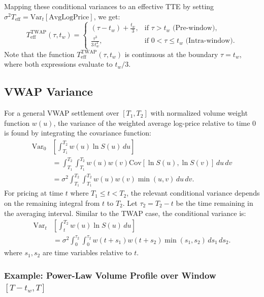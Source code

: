 \documentclass[11pt]{article}
\theoremstyle{plain}
\begin{document}
Mapping these conditional variances to an effective TTE by setting $\sigma^2 T_{\mathrm{eff}} = \mathrm{Var}_t[\text{AvgLogPrice}]$, we get:
\begin{equation} \label{eq:tte_eff_twap}
  T_{\mathrm{eff}}^{\mathrm{TWAP}}(\tau, t_w) =
  \begin{cases}
    (\tau - t_w) + \frac{t_w}{3}, & \text{if } \tau > t_w \text{ (Pre-window)}, \\
    \frac{\tau^3}{3\,t_w^2},       & \text{if } 0 < \tau \le t_w \text{ (Intra-window)}.
  \end{cases}
\end{equation}
Note that the function $T_{\mathrm{eff}}^{\mathrm{TWAP}}(\tau, t_w)$ is continuous at the boundary $\tau = t_w$, where both expressions evaluate to $t_w/3$.

\subsection{VWAP Variance}
\label{sec:vwap_variance}

For a general VWAP settlement over $[T_1, T_2]$ with normalized volume weight function $w(u)$, the variance of the weighted average log-price relative to time 0 is found by integrating the covariance function:
\begin{align}
  \mathrm{Var}_0&\left[ \int_{T_1}^{T_2} w(u) \ln S(u) \,du \right] \nonumber \\
  &= \int_{T_1}^{T_2} \int_{T_1}^{T_2} w(u) w(v) \mathrm{Cov}[\ln S(u), \ln S(v)] \,du\,dv \nonumber \\
  &= \sigma^2 \int_{T_1}^{T_2} \int_{T_1}^{T_2} w(u) w(v) \min(u,v)\,du\,dv. \label{eq:vwap_var0_general}
\end{align}
For pricing at time $t$ where $T_1 \le t < T_2$, the relevant conditional variance depends on the remaining integral from $t$ to $T_2$. Let $\tau_2 = T_2 - t$ be the time remaining in the averaging interval. Similar to the TWAP case, the conditional variance is:
\begin{align}
  \mathrm{Var}_t&\left[ \int_{t}^{T_2} w(u) \ln S(u) \,du \right] \nonumber \\
  &= \sigma^2 \int_{0}^{\tau_2} \int_{0}^{\tau_2} w(t+s_1) w(t+s_2) \min(s_1, s_2) \,ds_1\,ds_2. \label{eq:vwap_vart_general_s}
\end{align}
where $s_1, s_2$ are time variables relative to $t$.

\subsubsection{Example: Power-Law Volume Profile over Window $[T-t_w, T]$}
\label{sec:vwap_powerlaw_window_final} %
\end{document}

